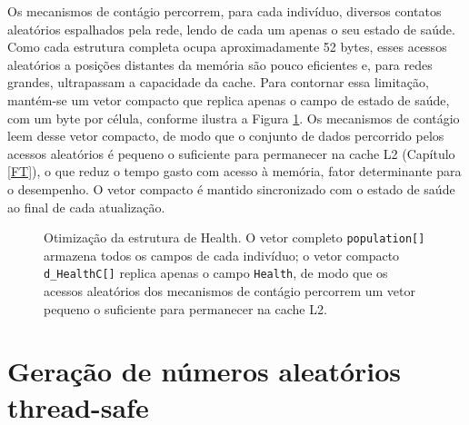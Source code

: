 \documentclass[
	12pt,				%
	openright,			%
	oneside,			%
	a4paper,			%
	english,			%
	french,				%
	spanish,			%
	brazil				%
	]{abntex2}
\begin{document}
Os mecanismos de contágio percorrem, para cada indivíduo, diversos contatos aleatórios espalhados pela rede, lendo de cada um apenas o seu estado de saúde. Como cada estrutura completa ocupa aproximadamente 52 bytes, esses acessos aleatórios a posições distantes da memória são pouco eficientes e, para redes grandes, ultrapassam a capacidade da cache. Para contornar essa limitação, mantém-se um vetor compacto que replica apenas o campo de estado de saúde, com um byte por célula, conforme ilustra a Figura \ref{fig:healthsoa}. Os mecanismos de contágio leem desse vetor compacto, de modo que o conjunto de dados percorrido pelos acessos aleatórios é pequeno o suficiente para permanecer na cache L2 (Capítulo \ref{FT}), o que reduz o tempo gasto com acesso à memória, fator determinante para o desempenho. O vetor compacto é mantido sincronizado com o estado de saúde ao final de cada atualização.

\begin{figure}[H]
\centering
{}
\caption{Otimização da estrutura de Health. O vetor completo \texttt{population[]} armazena todos os campos de cada indivíduo; o vetor compacto \texttt{d\_HealthC[]} replica apenas o campo \texttt{Health}, de modo que os acessos aleatórios dos mecanismos de contágio percorrem um vetor pequeno o suficiente para permanecer na cache L2.}
\label{fig:healthsoa}
\end{figure}

\section{Geração de números aleatórios thread-safe}
\end{document}
